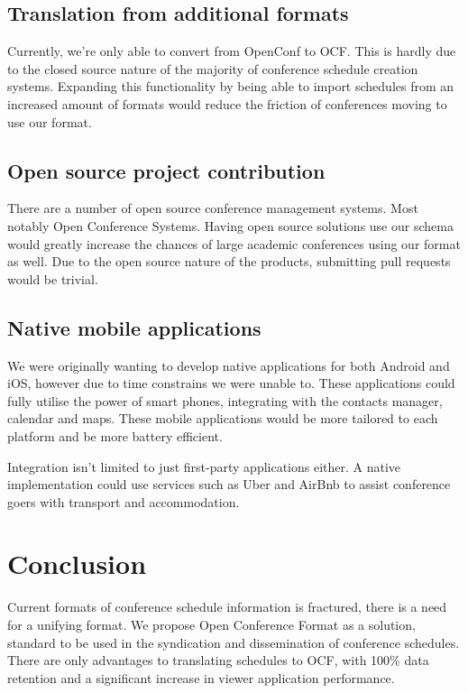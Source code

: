 \documentclass[conference]{IEEEtran}
\begin{document}
\subsection{Translation from additional formats}
Currently, we're only able to convert from OpenConf to OCF. This is hardly due to the closed source nature of the majority of conference schedule creation systems. Expanding this functionality by being able to import schedules from an increased amount of formats would reduce the friction of conferences moving to use our format.

\subsection{Open source project contribution}
There are a number of open source conference management systems. Most notably Open Conference Systems\cite{ocsWebsite}. Having open source solutions use our schema would greatly increase the chances of large academic conferences using our format as well. Due to the open source nature of the products, submitting pull requests would be trivial.

\subsection{Native mobile applications}
We were originally wanting to develop native applications for both Android and iOS, however due to time constrains we were unable to. These applications could fully utilise the power of smart phones, integrating with the contacts manager, calendar and maps. These mobile applications would be more tailored to each platform and be more battery efficient.

Integration isn't limited to just first-party applications either. A native implementation could use services such as Uber and AirBnb to assist conference goers with transport and accommodation.

\section{Conclusion}
Current formats of conference schedule information is fractured, there is a need for a unifying format. We propose Open Conference Format as a solution, standard to be used in the syndication and dissemination of conference schedules. There are only advantages to translating schedules to OCF, with 100\% data retention and a significant increase in viewer application performance.
\end{document}
